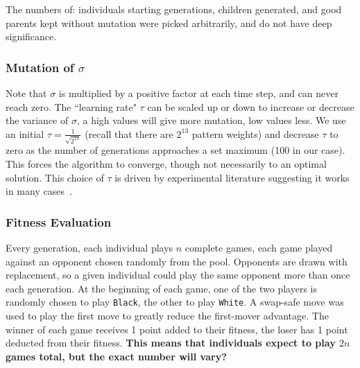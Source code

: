 \documentclass{acm_proc_article-sp}
\newcommand{\black}{\texttt{Black}}
\newcommand{\white}{\texttt{White}}
\begin{document}
The numbers of:  individuals starting generations, children generated, and good parents kept without mutation
were picked arbitrarily, and do not have deep significance.

\subsubsection*{Mutation of $\sigma$}
Note that $\sigma$ is multiplied by a positive factor at each time step, and can never reach zero. 
The ``learning rate" $\tau$  can be scaled up or down to increase or decrease the variance of $\sigma$, a high values will give more mutation, low values less. 
We use an initial $\tau = \frac{1}{\sqrt{2^{13}}}$ (recall that there are $2^{13}$  pattern weights) and decrease $\tau$ to zero 
as the number of generations approaches a set maximum (100 in our case). 
This forces the algorithm to converge, though not necessarily to an optimal solution. 
This choice of $\tau$ is driven by experimental literature suggesting it works in many cases~\cite{Beyer:2007}.

%

\subsubsection*{Fitness Evaluation}

Every generation, each individual plays $n$ complete games, each game played against an opponent chosen  randomly from the pool.
Opponents are drawn with replacement, so a given individual could play the same opponent more than once each generation. 
At the beginning of each game, one of the two players is randomly chosen to play \black, the other to play \white. 
A swap-safe move was used to play the first move to greatly reduce the first-mover advantage. 
The winner of each game receives 1 point added to their fitness, the loser has 1 point deducted from their fitness.
\textbf{This means that individuals expect to play $2n$ games total, but the exact number will vary?}
\end{document}

